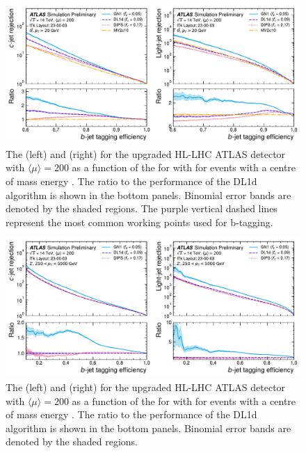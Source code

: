 \begin{figure}[!p]
    \centering
    \includegraphics[width=\textwidth]{chapters/gnn_tagger/figs/gn1_hl_ttbar.pdf}
    \caption{
        The \crej (left) and \lrej (right) for the upgraded HL-LHC ATLAS detector with $\langle \mu \rangle = 200$ as a function of the \beff for \ttbarjets with \ttbarpt for events with a centre of mass energy  \cite{ATL-PHYS-PUB-2022-047}.
        The ratio to the performance of the DL1d algorithm is shown in the bottom panels.
        Binomial error bands are denoted by the shaded regions.
        The purple vertical dashed lines represent the most common working points used for b-tagging.
    }
    \label{fig:gn1_hllhc_ttbar}
\end{figure}

\begin{figure}[!p]
    \centering
    \includegraphics[width=\textwidth]{chapters/gnn_tagger/figs/gn1_hl_zprime.pdf}
    \caption{
        The \crej (left) and \lrej (right) for the upgraded HL-LHC ATLAS detector with $\langle \mu \rangle = 200$ as a function of the \beff for \Zprimejets with \Zprimept for events with a centre of mass energy  \cite{ATL-PHYS-PUB-2022-047}.
        The ratio to the performance of the DL1d algorithm is shown in the bottom panels.
        Binomial error bands are denoted by the shaded regions.
    }
    \label{fig:gn1_hllhc_zprime}
\end{figure}


